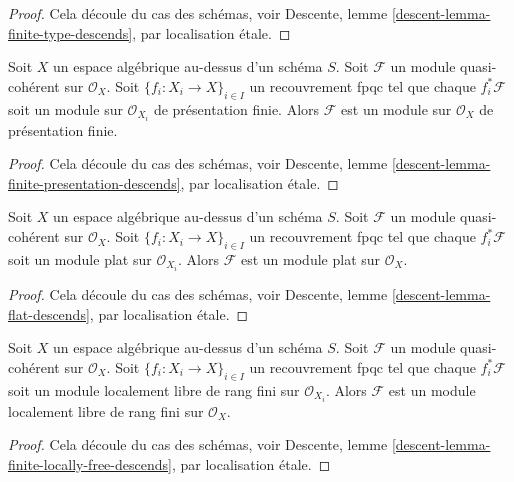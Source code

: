 \begin{proof}
Cela découle du cas des schémas, voir
Descente, lemme \ref{descent-lemma-finite-type-descends},
par localisation \'etale.
\end{proof}

\begin{lemma}
\label{lemma-finite-presentation-descends}
Soit $X$ un espace algébrique au-dessus d'un schéma $S$.
Soit $\mathcal{F}$ un module quasi-cohérent sur $\mathcal{O}_X$.
Soit $\{f_i : X_i \to X\}_{i \in I}$ un recouvrement fpqc tel que
chaque $f_i^*\mathcal{F}$ soit un module sur $\mathcal{O}_{X_i}$ de présentation
finie. Alors $\mathcal{F}$ est un module sur $\mathcal{O}_X$
de présentation finie.
\end{lemma}

\begin{proof}
Cela découle du cas des schémas, voir
Descente, lemme \ref{descent-lemma-finite-presentation-descends},
par localisation \'etale.
\end{proof}

\begin{lemma}
\label{lemma-flat-descends}
Soit $X$ un espace algébrique au-dessus d'un schéma $S$.
Soit $\mathcal{F}$ un module quasi-cohérent sur $\mathcal{O}_X$.
Soit $\{f_i : X_i \to X\}_{i \in I}$ un recouvrement fpqc tel que
chaque $f_i^*\mathcal{F}$ soit un module plat sur $\mathcal{O}_{X_i}$.
Alors $\mathcal{F}$ est un module plat sur $\mathcal{O}_X$.
\end{lemma}

\begin{proof}
Cela découle du cas des schémas, voir
Descente, lemme \ref{descent-lemma-flat-descends},
par localisation \'etale.
\end{proof}

\begin{lemma}
\label{lemma-finite-locally-free-descends}
Soit $X$ un espace algébrique au-dessus d'un schéma $S$.
Soit $\mathcal{F}$ un module quasi-cohérent sur $\mathcal{O}_X$.
Soit $\{f_i : X_i \to X\}_{i \in I}$ un recouvrement fpqc tel que
chaque $f_i^*\mathcal{F}$ soit un module localement libre de rang fini sur $\mathcal{O}_{X_i}$.
Alors $\mathcal{F}$ est un module localement libre de rang fini sur $\mathcal{O}_X$.
\end{lemma}

\begin{proof}
Cela découle du cas des schémas, voir
Descente, lemme \ref{descent-lemma-finite-locally-free-descends},
par localisation \'etale.
\end{proof}

